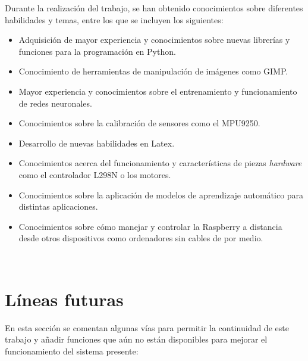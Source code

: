 Durante la realización del trabajo, se han obtenido conocimientos sobre diferentes habilidades y temas, entre los que se incluyen los siguientes:

\begin{itemize}

 \item \textit{} Adquisición de mayor experiencia y conocimientos sobre nuevas librerías y funciones para la programación en Python.
 \item \textit{} Conocimiento de herramientas de manipulación de imágenes como GIMP.
 \item \textit{} Mayor experiencia y conocimientos sobre el entrenamiento y funcionamiento de redes neuronales.
  \item \textit{} Conocimientos sobre la calibración de sensores como el MPU9250.
   \item \textit{} Desarrollo de nuevas habilidades en Latex.
  \item \textit{} Conocimientos acerca del funcionamiento y características de piezas \textit{hardware} como el controlador L298N o los motores.
  \item \textit{} Conocimientos sobre la aplicación de modelos de aprendizaje automático para distintas aplicaciones.
  \item \textit{} Conocimientos sobre cómo manejar y controlar la Raspberry a distancia desde otros dispositivos como ordenadores sin cables de por medio.
  
\end{itemize}\


\section{Líneas futuras}
\label{sec:lineas_futuras}

En esta sección se comentan algunas vías para permitir la continuidad de este trabajo y añadir funciones que aún no están disponibles para mejorar el funcionamiento del sistema presente:

